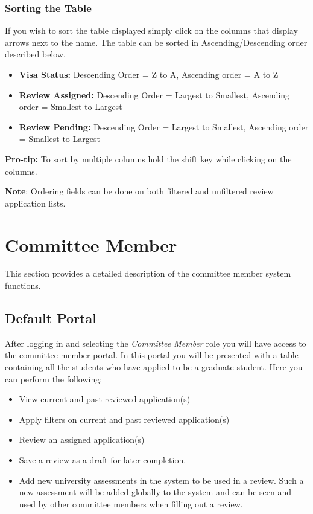 \documentclass[fontsize=12pt,paper=letter,twoside]{scrartcl}
\begin{document}
\subsubsection{Sorting the Table}
If you wish to sort the table displayed simply click on the columns that display arrows next to the name. The table can be sorted in Ascending/Descending order described below.
\begin{itemize}
\item \textbf{Visa Status:} Descending Order = Z to A, Ascending order = A to Z
\item \textbf{Review Assigned:} Descending Order = Largest to Smallest, Ascending order = Smallest to Largest
\item \textbf{Review Pending:} Descending Order = Largest to Smallest, Ascending order = Smallest to Largest
\end{itemize}
\textbf{Pro-tip:} To sort by multiple columns hold the shift key while clicking on the columns.

\bigskip
\noindent \textbf{Note}: Ordering fields can be done on both filtered and unfiltered review application lists.

\clearpage
\newpage
\section{Committee Member}
This section provides a detailed description of the committee member system functions.

\subsection{Default Portal}
After logging in and selecting the \emph{Committee Member} role you will have access to the committee member portal. In this portal you will be presented with a table containing all the students who have applied to be a graduate student. Here you can perform the following:
\begin{itemize}
\item View current and past reviewed application(s)
\item Apply filters on current and past reviewed application(s)
\item Review an assigned application(s)
\item Save a review as a draft for later completion.
\item Add new university assessments in the system to be used in a review. Such a new assessment will be added globally to the system and can be seen and used by other committee members when filling out a review.
\end{itemize} 
\end{document}
